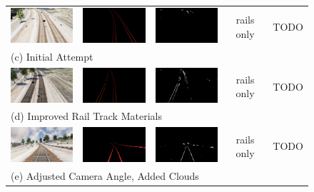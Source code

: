 \begin{figure}
\begin{tabular}{ccccc}
  \includegraphics[width=30mm]{src/img/results-ml-0/par0/frame.png} & 
  \includegraphics[width=30mm]{src/img/results-ml-0/par0/seg.png} & 
  \includegraphics[width=30mm]{src/img/results-ml-0/par0/det.png} &
  rails only & TODO \\
  \multicolumn{5}{l}{ (c) Initial Attempt } \\ \hline
  
  \includegraphics[width=30mm]{src/img/results-ml-0/par1/frame.png} & 
  \includegraphics[width=30mm]{src/img/results-ml-0/par1/seg.png} & 
  \includegraphics[width=30mm]{src/img/results-ml-0/par1/det.png} &
  rails only & TODO \\
  \multicolumn{5}{l}{   (d) Improved Rail Track Materials } \\ \hline
  
  \includegraphics[width=30mm]{src/img/results-ml-0/par2/frame.png} & 
  \includegraphics[width=30mm]{src/img/results-ml-0/par2/seg.png} & 
  \includegraphics[width=30mm]{src/img/results-ml-0/par2/det.png} &
  rails only & TODO \\
  \multicolumn{5}{l}{  (e) Adjusted Camera Angle, Added Clouds  } \\ \hline
  

\end{tabular}
\end{figure}
